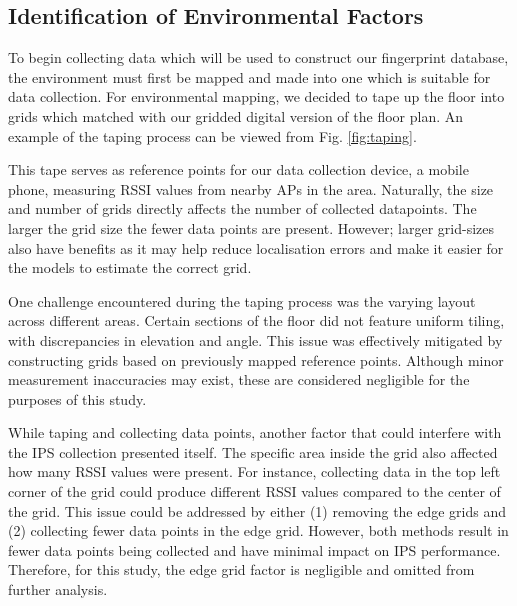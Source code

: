\documentclass[conference]{IEEEtran}
\begin{document}
	
	
	\subsection{Identification of Environmental Factors}
	To begin collecting data which will be used to construct our fingerprint database, the environment must first be mapped and made into one which is suitable for data collection. For environmental mapping, we decided to tape up the floor into grids which matched with our gridded digital version of the floor plan. An example of the taping process can be viewed from Fig. \ref{fig:taping}. 
	
	This tape serves as reference points for our data collection device, a mobile phone, measuring RSSI values from nearby APs in the area. Naturally, the size and number of grids directly affects the number of collected datapoints. The larger the grid size the fewer data points are present. However; larger grid-sizes also have benefits as it may help reduce localisation errors and make it easier for the models to estimate the correct grid.
	
	
	One challenge encountered during the taping process was the varying layout across different areas. Certain sections of the floor did not feature uniform tiling, with discrepancies in elevation and angle. This issue was effectively mitigated by constructing grids based on previously mapped reference points. Although minor measurement inaccuracies may exist, these are considered negligible for the purposes of this study.
	
	While taping and collecting data points, another factor that could interfere with the IPS collection presented itself. The specific area inside the grid also affected how many RSSI values were present. For instance, collecting data in the top left corner of the grid could produce different RSSI values compared to the center of the grid. This issue could be addressed by either (1) removing the edge grids and (2) collecting fewer data points in the edge grid. However, both methods result in fewer data points being collected and have minimal impact on IPS performance. Therefore, for this study, the edge grid factor is negligible and omitted from further analysis.
	
\end{document}
